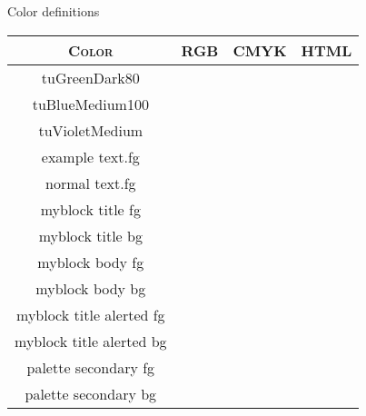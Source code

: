 \documentclass{beamer}
\newcommand{\extractHTML}[1]{\extractcolorspecs{#1}{\model}{\mycolor} \convertcolorspec{\model}{\mycolor}{HTML}\printcol \printcol}
\newcommand{\extractRGB}[1]{\extractcolorspecs{#1}{\model}{\mycolor} \convertcolorspec{\model}{\mycolor}{RGB}\printcol \printcol}
\newcommand{\extractCMYK}[1]{\extractcolorspecs{#1}{\model}{\mycolor} \convertcolorspec{\model}{\mycolor}{cmyk}\printcol \printcol}
\newcommand{\colrow}[1]{{\color{#1}#1} & \extractRGB{#1} & \extractCMYK{#1} & \extractHTML{#1}}
\begin{document}
\begin{frame}{Color definitions}
\footnotesize
\begin{center}
\begin{tabular}{cccc}
\toprule
\multicolumn{1}{c|}{\textsc{Color}} &
\multicolumn{1}{c}{\textsc{RGB}} &
\multicolumn{1}{c}{\textsc{CMYK}} &
\multicolumn{1}{c}{\textsc{HTML}}\\
\midrule 
\colrow{tuGreenDark80}\\
\colrow{tuBlueMedium100}\\
\colrow{tuVioletMedium}\\
\colrow{example text.fg}\\
\colrow{normal text.fg}\\
\colrow{myblock title fg}\\
\colrow{myblock title bg}\\
\colrow{myblock body fg}\\
\colrow{myblock body bg}\\
\colrow{myblock title alerted fg}\\
\colrow{myblock title alerted bg}\\
\colrow{palette secondary fg}\\
\colrow{palette secondary bg}\\
\bottomrule
\end{tabular}
\end{center}

\end{frame}    
\end{document}
